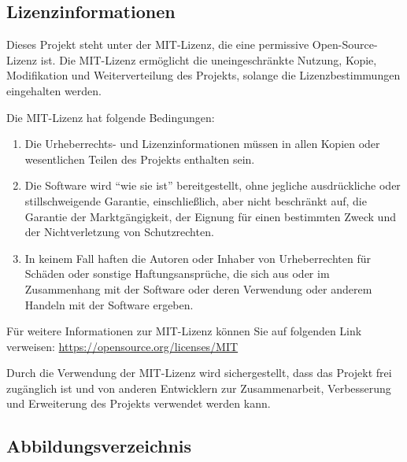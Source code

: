 \documentclass[a4paper]{article}
\begin{document}
\clearpage

\subsection{Lizenzinformationen}
Dieses Projekt steht unter der MIT-Lizenz, die eine permissive Open-Source-Lizenz ist. Die MIT-Lizenz ermöglicht die uneingeschränkte Nutzung, Kopie, Modifikation und Weiterverteilung des Projekts, solange die Lizenzbestimmungen eingehalten werden.

Die MIT-Lizenz hat folgende Bedingungen:

\begin{enumerate}
	\item Die Urheberrechts- und Lizenzinformationen müssen in allen Kopien oder wesentlichen Teilen des Projekts enthalten sein.
	\item Die Software wird ``wie sie ist'' bereitgestellt, ohne jegliche ausdrückliche oder stillschweigende Garantie, einschließlich, aber nicht beschränkt auf, die Garantie der Marktgängigkeit, der Eignung für einen bestimmten Zweck und der Nichtverletzung von Schutzrechten.
	\item In keinem Fall haften die Autoren oder Inhaber von Urheberrechten für Schäden oder sonstige Haftungsansprüche, die sich aus oder im Zusammenhang mit der Software oder deren Verwendung oder anderem Handeln mit der Software ergeben.
\end{enumerate}

Für weitere Informationen zur MIT-Lizenz können Sie auf folgenden Link verweisen: \url{https://opensource.org/licenses/MIT}

Durch die Verwendung der MIT-Lizenz wird sichergestellt, dass das Projekt frei zugänglich ist und von anderen Entwicklern zur Zusammenarbeit, Verbesserung und Erweiterung des Projekts verwendet werden kann.

\newpage

\subsection{Abbildungsverzeichnis}
\listoffigures
\end{document}
